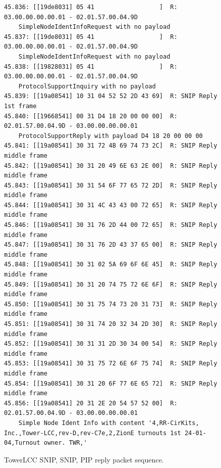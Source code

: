 \documentclass[11pt]{article}
\begin{document}
\begin{figure}[!htbp]
\begin{verbatim}
45.836: [[19de8031] 05 41                  ]  R: 03.00.00.00.00.01 - 02.01.57.00.04.9D 
    SimpleNodeIdentInfoRequest with no payload
45.837: [[19de8031] 05 41                  ]  R: 03.00.00.00.00.01 - 02.01.57.00.04.9D 
    SimpleNodeIdentInfoRequest with no payload
45.838: [[19828031] 05 41                  ]  R: 03.00.00.00.00.01 - 02.01.57.00.04.9D 
    ProtocolSupportInquiry with no payload
45.839: [[19a08541] 10 31 04 52 52 2D 43 69]  R: SNIP Reply 1st frame
45.840: [[19668541] 00 31 D4 18 20 00 00 00]  R: 02.01.57.00.04.9D - 03.00.00.00.00.01 
    ProtocolSupportReply with payload D4 18 20 00 00 00
45.841: [[19a08541] 30 31 72 4B 69 74 73 2C]  R: SNIP Reply middle frame
45.842: [[19a08541] 30 31 20 49 6E 63 2E 00]  R: SNIP Reply middle frame
45.843: [[19a08541] 30 31 54 6F 77 65 72 2D]  R: SNIP Reply middle frame
45.844: [[19a08541] 30 31 4C 43 43 00 72 65]  R: SNIP Reply middle frame
45.846: [[19a08541] 30 31 76 2D 44 00 72 65]  R: SNIP Reply middle frame
45.847: [[19a08541] 30 31 76 2D 43 37 65 00]  R: SNIP Reply middle frame
45.848: [[19a08541] 30 31 02 5A 69 6F 6E 45]  R: SNIP Reply middle frame
45.849: [[19a08541] 30 31 20 74 75 72 6E 6F]  R: SNIP Reply middle frame
45.850: [[19a08541] 30 31 75 74 73 20 31 73]  R: SNIP Reply middle frame
45.851: [[19a08541] 30 31 74 20 32 34 2D 30]  R: SNIP Reply middle frame
45.852: [[19a08541] 30 31 31 2D 30 34 00 54]  R: SNIP Reply middle frame
45.853: [[19a08541] 30 31 75 72 6E 6F 75 74]  R: SNIP Reply middle frame
45.854: [[19a08541] 30 31 20 6F 77 6E 65 72]  R: SNIP Reply middle frame
45.856: [[19a08541] 20 31 2E 20 54 57 52 00]  R: 02.01.57.00.04.9D - 03.00.00.00.00.01 
    Simple Node Ident Info with content '4,RR-CirKits, Inc.,Tower-LCC,rev-D,rev-C7e,2,ZionE turnouts 1st 24-01-04,Turnout owner. TWR,'
\end{verbatim}
\caption{TowerLCC SNIP, SNIP, PIP reply packet sequence.}
\label{fig:TWR_SNIP2PIP_reply_sequence}
\end{figure}
\end{document}
